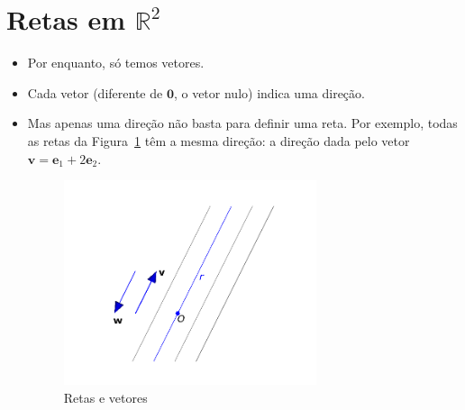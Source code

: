 \documentclass[
  letterpaper,
  DIV=11,
  numbers=noendperiod]{scrreprt}
\begin{document}
\hypertarget{sec-retas}{%
\section{\texorpdfstring{Retas em
$\mathbb{R}^2$}{Retas em }}\label{sec-retas}}

\begin{itemize}
\item
  Por enquanto, só temos vetores.
\item
  Cada vetor (diferente de $\mathbf{0}$, o vetor nulo) indica uma
  direção.
\item
  Mas apenas uma direção não basta para definir uma reta. Por exemplo,
  todas as retas da Figura~\ref{fig-retas} têm a mesma direção: a
  direção dada pelo vetor
  $\mathbf{v} = \mathbf{e}_{1} + 2\mathbf{e}_{2}$.

  \begin{figure}[htb]

  {\centering \includegraphics[width=0.7\textwidth,height=\textheight]{figures/fig-retas.png}

  }

  \caption{\label{fig-retas}Retas e vetores}


\end{figure}
\end{itemize}
\end{document}
